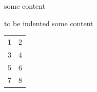 some content %

to be indented
some content %

\begin{tabular}{cc}
1&2\\
3&4\\
5&6\\%
7&8\\
\end{tabular}
